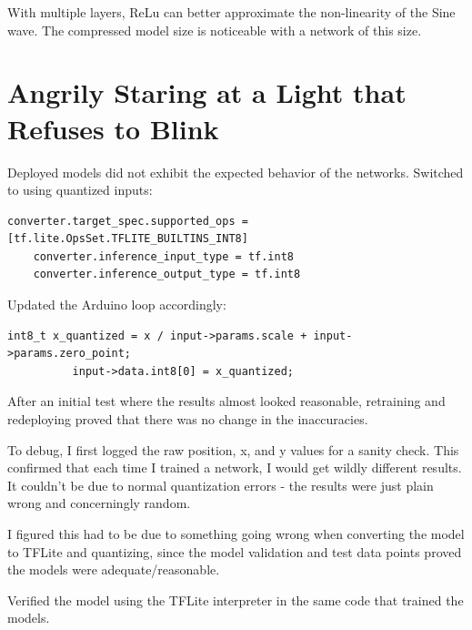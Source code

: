 \documentclass{article}
\begin{document}
    With multiple layers, ReLu can better approximate the non-linearity of the Sine wave.
    The compressed model size is noticeable with a network of this size.

    \section{Angrily Staring at a Light that Refuses to Blink }\label{sec:arduino}

    Deployed models did not exhibit the expected behavior of the networks.
    Switched to using quantized inputs:

    \begin{lstlisting}[label={lst:qin}]
    converter.target_spec.supported_ops = [tf.lite.OpsSet.TFLITE_BUILTINS_INT8]
    converter.inference_input_type = tf.int8
    converter.inference_output_type = tf.int8
    \end{lstlisting}

    Updated the Arduino loop accordingly:

    \begin{lstlisting}[label={lst:aloop}]
          int8_t x_quantized = x / input->params.scale + input->params.zero_point;
          input->data.int8[0] = x_quantized;
    \end{lstlisting}

    After an initial test where the results almost looked reasonable, retraining and redeploying proved that there was no change in the inaccuracies.

    To debug, I first logged the raw position, x, and y values for a sanity check.
    This confirmed that each time I trained a network, I would get wildly different results.
    It couldn't be due to normal quantization errors - the results were just plain wrong and concerningly random.

    I figured this had to be due to something going wrong when converting the model to TFLite and quantizing, since the model validation and test data points proved the models were adequate/reasonable.

    Verified the model using the TFLite interpreter in the same code that trained the models.
\end{document}
